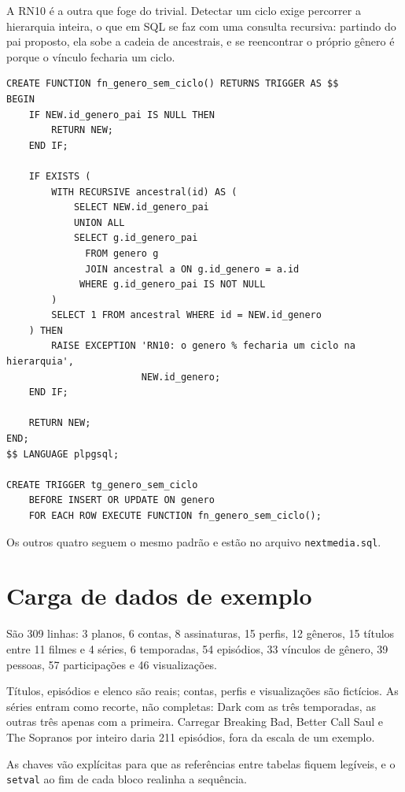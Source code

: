 \documentclass[a4paper,12pt,oneside,openany]{book}
\newcommand{\bd}[1]{\texttt{#1}}
\begin{document}
A RN10 é a outra que foge do trivial. Detectar um ciclo exige percorrer a
hierarquia inteira, o que em SQL se faz com uma consulta recursiva: partindo do
pai proposto, ela sobe a cadeia de ancestrais, e se reencontrar o próprio
gênero é porque o vínculo fecharia um ciclo.

\begin{lstlisting}[caption={Detecção de ciclo na hierarquia de gêneros (RN10).},label={lst:gatilho-ciclo},basicstyle=\ttfamily\scriptsize]
CREATE FUNCTION fn_genero_sem_ciclo() RETURNS TRIGGER AS $$
BEGIN
    IF NEW.id_genero_pai IS NULL THEN
        RETURN NEW;
    END IF;

    IF EXISTS (
        WITH RECURSIVE ancestral(id) AS (
            SELECT NEW.id_genero_pai
            UNION ALL
            SELECT g.id_genero_pai
              FROM genero g
              JOIN ancestral a ON g.id_genero = a.id
             WHERE g.id_genero_pai IS NOT NULL
        )
        SELECT 1 FROM ancestral WHERE id = NEW.id_genero
    ) THEN
        RAISE EXCEPTION 'RN10: o genero % fecharia um ciclo na hierarquia',
                        NEW.id_genero;
    END IF;

    RETURN NEW;
END;
$$ LANGUAGE plpgsql;

CREATE TRIGGER tg_genero_sem_ciclo
    BEFORE INSERT OR UPDATE ON genero
    FOR EACH ROW EXECUTE FUNCTION fn_genero_sem_ciclo();
\end{lstlisting}

Os outros quatro seguem o mesmo padrão e estão no arquivo
\bd{nextmedia.sql}.

\section{Carga de dados de exemplo}\label{sec:carga}

São 309 linhas: 3 planos, 6 contas, 8 assinaturas, 15 perfis, 12 gêneros, 15
títulos entre 11 filmes e 4 séries, 6 temporadas, 54 episódios, 33 vínculos de
gênero, 39 pessoas, 57 participações e 46 visualizações.

Títulos, episódios e elenco são reais; contas, perfis e visualizações são
fictícios. As séries entram como recorte, não completas: Dark com as três
temporadas, as outras três apenas com a primeira. Carregar Breaking Bad,
Better Call Saul e The Sopranos por inteiro daria 211 episódios, fora da escala
de um exemplo.

As chaves vão explícitas para que as referências entre tabelas fiquem
legíveis, e o \bd{setval} ao fim de cada bloco realinha a sequência.
\end{document}
